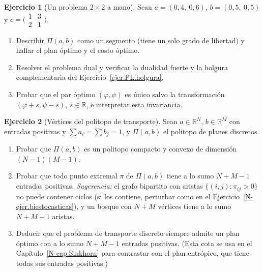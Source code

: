 \documentclass[11pt,a4paper]{amsart}
\newcounter{chapter}
\newcommand{\R}{{\mathbb R}}
\theoremstyle{remark}
\theoremstyle{definition}
\newtheorem{ejercicio}{Ejercicio}[chapter]
\numberwithin{subsection}{section}
\numberwithin{equation}{section}
\begin{document}
\begin{ejercicio}[Un problema $2\times2$ a mano]\label{ejer.PL.2x2}
Sean $a=(0{,}4,\ 0{,}6)$, $b=(0{,}5,\ 0{,}5)$ y
$c=\bigl(\begin{smallmatrix}1&3\\2&1\end{smallmatrix}\bigr)$.
\begin{enumerate}[label=(\alph*)]
\item Describir $\Pi(a,b)$ como un segmento (tiene un solo grado de
libertad) y hallar el plan óptimo y el costo óptimo.
\item Resolver el problema dual y verificar la dualidad fuerte y la holgura
complementaria del Ejercicio~\ref{ejer.PL.holgura}.
\item Probar que el par óptimo $(\varphi,\psi)$ es único salvo la
transformación $(\varphi+s,\psi-s)$, $s\in\R$, e interpretar esta
invariancia.
\end{enumerate}
\end{ejercicio}

\begin{ejercicio}[Vértices del politopo de transporte]\label{ejer.PL.vertices}
Sean $a\in\R^N$, $b\in\R^M$ con entradas positivas y
$\sum a_i=\sum b_j=1$, y $\Pi(a,b)$ el politopo de planes discretos.
\begin{enumerate}[label=(\alph*)]
\item Probar que $\Pi(a,b)$ es un politopo compacto y convexo de dimensión
$(N-1)(M-1)$.
\item Probar que todo punto extremal $\pi$ de $\Pi(a,b)$ tiene a lo sumo
$N+M-1$ entradas positivas. \emph{Sugerencia:} el grafo bipartito con
aristas $\{(i,j):\pi_{ij}>0\}$ no puede contener ciclos (si los contiene,
perturbar como en el Ejercicio~\ref{N-ejer.biestocasticas}), y un bosque con
$N+M$ vértices tiene a lo sumo $N+M-1$ aristas.
\item Deducir que el problema de transporte discreto siempre admite un plan
óptimo con a lo sumo $N+M-1$ entradas positivas. (Esta cota se usa en el
Capítulo~\ref{N-cap.Sinkhorn} para contrastar con el plan entrópico, que
tiene todas sus entradas positivas.)
\end{enumerate}
\end{ejercicio}
\end{document}
